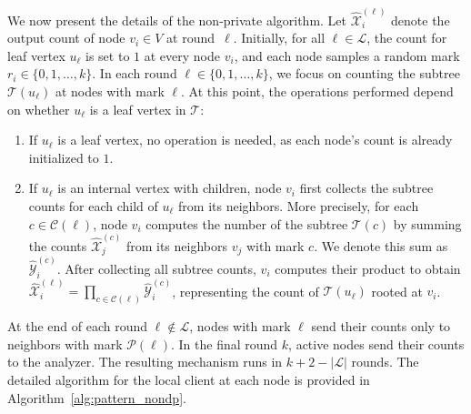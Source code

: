We now present the details of the non-private algorithm. 
Let $\widehat{\mathcal{X}}_i^{(\ell)}$ denote the output count of node $v_i \in V$ at round~$\ell$.  
Initially, for all $\ell \in \mathcal{L}$, the count for leaf vertex $u_\ell$ is set to $1$ at every node $v_i$, and each node samples a random mark $r_i \in \{0, 1, \dots, k\}$. 
In each round $\ell \in \{0, 1, \dots, k\}$, we focus on counting the subtree $\mathcal{T}(u_\ell)$ at nodes with mark $\ell$.
At this point, the operations performed depend on whether $u_\ell$ is a leaf vertex in $\mathcal{T}$:
\begin{enumerate}
    \item If $u_\ell$ is a leaf vertex, no operation is needed, as each node's count is already initialized to $1$.
    \item If $u_\ell$ is an internal vertex with children, node $v_i$ first collects the subtree counts for each child of $u_\ell$ from its neighbors.
    More precisely, for each $c \in \mathcal{C}(\ell)$, node $v_i$ computes the number of the subtree $\mathcal{T}(c)$ by summing the counts $\widehat{\mathcal{X}}_j^{(c)}$ from its neighbors $v_j$ with mark $c$. 
    We denote this sum as $\widehat{\mathcal{Y}}^{(c)}_i$. 
    After collecting all subtree counts, $v_i$ computes their product to obtain $\widehat{\mathcal{X}}^{(\ell)}_i = \prod_{c \in \mathcal{C}(\ell)} 
        \widehat{\mathcal{Y}}_i^{(c)}$, representing the count of $\mathcal{T}(u_\ell)$ rooted at $v_i$.  
\end{enumerate}
At the end of each round $\ell \notin \mathcal{L}$, nodes with mark $\ell$ send their counts only to neighbors with mark $\mathcal{P}(\ell)$. 
In the final round $k$, active nodes send their counts to the analyzer.
The resulting mechanism runs in $k+2-|\mathcal{L}|$ rounds.
The detailed algorithm for the local client at each node is provided in Algorithm~\ref{alg:pattern_nondp}.


